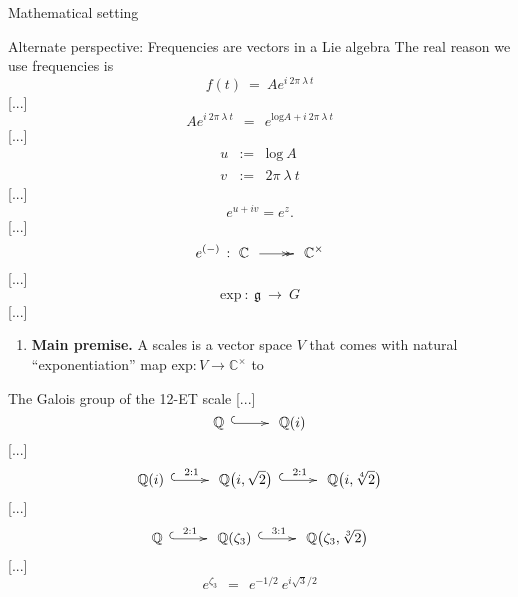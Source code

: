 \documentclass[letterpaper,11pt, reqno]{amsart}
\makeatletter
\newtheorem{monodromy theorem}{Monodromy Theorem}[subsection]
\newtheorem{research objectives}{Research objectives}[subsection]
\newtheorem{research question}[theorem]{Research questions}
\newtheorem{aside question}[theorem]{Aside question}
\newtheorem{blank remark}[theorem]{}
\newtheorem{terminology and comment}[theorem]{Terminology and comment}
\newtheorem{purity hypothesis}[theorem]{Purity hypothesis}
\newtheorem{corollary of the purity hypothesis}[theorem]{Corollary of the purity hypothesis}
\newcommand{\CC} {{\mathbb C}}
\newcommand{\lra}{{\longrightarrow}}
\newcommand{\mono}{\!\xymatrix{{}\ar@{^{(}->}[r]&{}}\!}
\newcommand{\epi}{\!\xymatrix{{}\ar@{->>}[r]&{}}\!}
\numberwithin{equation}{theorem}
\makeatother
\begin{document}
\begin{section}{Mathematical setting}
\begin{subsection}{Alternate perspective: Frequencies are vectors in a Lie algebra}
The real reason we use frequencies is 
	$$
	f(t)
	\ =\ 
	Ae^{i\ \!2\pi\ \!\lambda\ \!t}
	$$
[...]
	$$
	Ae^{i\ \!2\pi\ \!\lambda\ \!t}
	\ \ =\ \ 
	e^{\text{log}A+i\ \!2\pi\ \!\lambda\ \!t}
	$$
[...]
	$$
	\begin{array}{rcl}
	u & \!\!:=\!\! & \text{log}_{\ \!}A \\
	v & \!\!:=\!\! & 2\pi\ \!\lambda\ \!t
	\end{array}
	$$
[...]
	$$
	e^{u+iv}=e^{z}.
	$$
[...]
	$$
	e^{(-)}\ \!:\ \CC\ \epi\ \CC^{\times}
	$$
[...]
	$$
	\text{exp}\ \!:\ \mathfrak{g}\ \lra\ G
	$$
[...]
\begin{enumerate}[label={\bf\ \ \ \ \ \ $\blacksquare$}]
\item {\bf Main premise.} A scales is a vector space $V$ that comes with natural ``exponentiation'' map $\text{exp}:V\lra \CC^\times$ to 
\end{enumerate}
	
\end{subsection}

\end{section}

\begin{section}{The Galois group of the 12-ET scale}
[...]
	$$
	\mathbb{Q}\ \mono\ \mathbb{Q}(i)
	$$
[...]
	$$
	\mathbb{Q}(i)\ \overset{2:1}{\mono}\ \mathbb{Q}\big(i,\sqrt{2}\big)\ \overset{2:1}{\mono}\ \mathbb{Q}\big(i,\sqrt[4]{2}\big)
	$$
[...]
	$$
	\mathbb{Q}\ \overset{2:1}{\mono}\ \mathbb{Q}(\zeta_3)\ \overset{3:1}{\mono}\ \mathbb{Q}\big(\zeta_3,\sqrt[3]{2}\big)
	$$
[...]
	$$
	e^{\zeta_3}
	\ \ =\ \ 
	e^{-1/2}\ e^{i\sqrt{3}/2}
	$$
\end{section}
\end{document}
